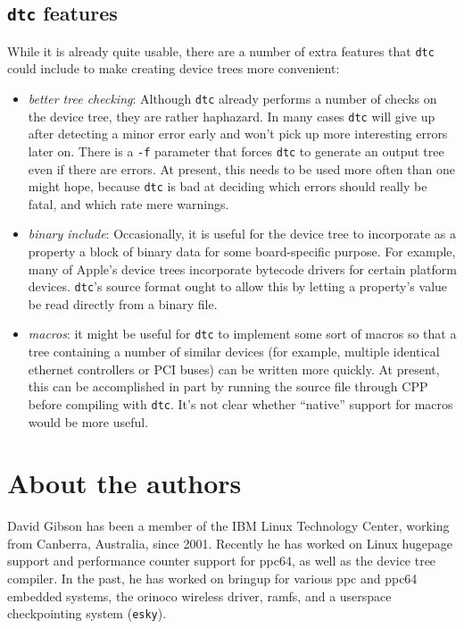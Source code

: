 \documentclass[a4paper,twocolumn]{article}
\newcommand{\dtc}{\texttt{dtc}\xspace}
\begin{document}
\subsection{\dtc features}

While it is already quite usable, there are a number of extra features
that \dtc could include to make creating device trees more convenient:
\begin{itemize}
\item \emph{better tree checking}: Although \dtc already performs a
  number of checks on the device tree, they are rather haphazard.  In
  many cases \dtc will give up after detecting a minor error early and
  won't pick up more interesting errors later on.  There is a
  \texttt{-f} parameter that forces \dtc to generate an output tree
  even if there are errors.  At present, this needs to be used more
  often than one might hope, because \dtc is bad at deciding which
  errors should really be fatal, and which rate mere warnings.
\item \emph{binary include}: Occasionally, it is useful for the device
  tree to incorporate as a property a block of binary data for some
  board-specific purpose.  For example, many of Apple's device trees
  incorporate bytecode drivers for certain platform devices.  \dtc's
  source format ought to allow this by letting a property's value be
  read directly from a binary file.
\item \emph{macros}: it might be useful for \dtc to implement some
  sort of macros so that a tree containing a number of similar devices
  (for example, multiple identical ethernet controllers or PCI buses)
  can be written more quickly.  At present, this can be accomplished
  in part by running the source file through CPP before compiling with
  \dtc.  It's not clear whether ``native'' support for macros would be
  more useful.
\end{itemize}




\section*{About the authors}

David Gibson has been a member of the IBM Linux Technology Center,
working from Canberra, Australia, since 2001.  Recently he has worked
on Linux hugepage support and performance counter support for ppc64,
as well as the device tree compiler.  In the past, he has worked on
bringup for various ppc and ppc64 embedded systems, the orinoco
wireless driver, ramfs, and a userspace checkpointing system
(\texttt{esky}).
\end{document}

